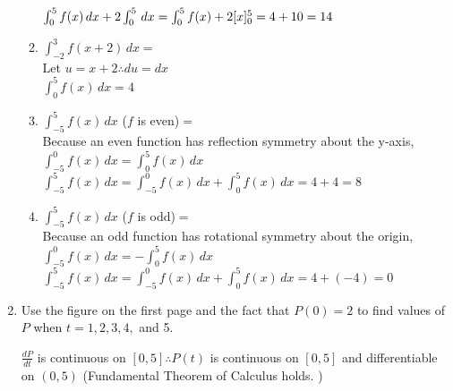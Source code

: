 \documentclass[10pt, letterpaper]{report}
\begin{document}
\begin{enumerate}
\begin{enumerate}
				$\int_{0}^{5}{f(x)}\,dx+2\int_{0}^{5}\,dx=
        \int_{0}^{5}{f(x)}+2[x]_{0}^{5}=
        4+10=14\\$

			\item{$\int_{-2}^{3}{f(x+2)}\,dx=$} \\

				Let $u=x+2\therefore du=dx$ \\

        $\int_{0}^{5}{f(x)}\,dx=4$ \\

			\item{$\int_{-5}^{5}{f(x)}\,dx$ ($f$ is even)$=$} \\

				Because an even function has reflection symmetry about the y-axis,
        $\int_{-5}^{0}{f(x)}\,dx=
        \int_{0}^{5}{f(x)}\,dx$ \\

        $\int_{-5}^{5}{f(x)}\,dx=
        \int_{-5}^{0}{f(x)}\,dx+\int_{0}^{5}{f(x)}\,dx=
        4+4=8$ \\

			\item{$\int_{-5}^{5}{f(x)}\,dx$ ($f$ is odd)$=$} \\

				Because an odd function has rotational symmetry about the origin,
        $\int_{-5}^{0}{f(x)}\,dx=
        -\int_{0}^{5}{f(x)}\,dx$ \\

        $\int_{-5}^{5}{f(x)}\,dx=
        \int_{-5}^{0}{f(x)}\,dx+\int_{0}^{5}{f(x)}\,dx=
        4+(-4)=0$ \\

		\end{enumerate}
	\item{Use the figure on the first page and the fact that $P(0)=2$ to find values of $P$ when $t=1,2,3,4,$ and 5. \\}

    $\frac{dP}{dt}$ is continuous on $[0,5] \therefore P(t)$ is continuous on $[0,5]$ and differentiable on $(0,5)$ (Fundamental Theorem of Calculus holds. ) \\


\end{enumerate}
\end{document}
